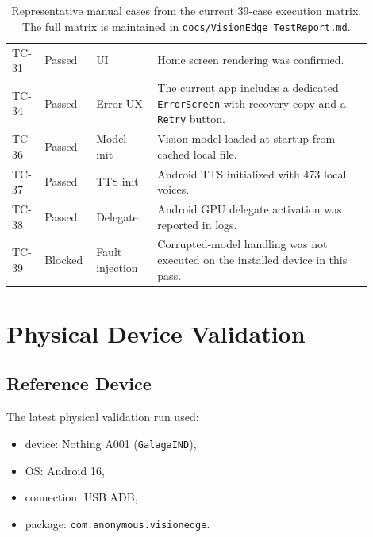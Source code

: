 \documentclass[conference]{IEEEtran}
\begin{document}
\begin{table}[t]
\begin{tabular}{p{0.08\linewidth} p{0.10\linewidth} p{0.16\linewidth} p{0.56\linewidth}}
TC-31 & Passed & UI & Home screen rendering was confirmed. \\
TC-34 & Passed & Error UX & The current app includes a dedicated \texttt{ErrorScreen} with recovery copy and a \texttt{Retry} button. \\
TC-36 & Passed & Model init & Vision model loaded at startup from cached local file. \\
TC-37 & Passed & TTS init & Android TTS initialized with 473 local voices. \\
TC-38 & Passed & Delegate & Android GPU delegate activation was reported in logs. \\
TC-39 & Blocked & Fault injection & Corrupted-model handling was not executed on the installed device in this pass. \\
\bottomrule
\end{tabular}
\caption{Representative manual cases from the current 39-case execution matrix. The full matrix is maintained in \texttt{docs/VisionEdge\_TestReport.md}.}
\label{tab:manualcases}
\end{table}

\section{Physical Device Validation}
\subsection{Reference Device}
The latest physical validation run used:
\begin{itemize}[leftmargin=1.2em]
\item device: Nothing A001 (\texttt{GalagaIND}),
\item OS: Android 16,
\item connection: USB ADB,
\item package: \texttt{com.anonymous.visionedge}.
\end{itemize}
\end{document}
